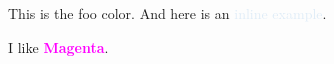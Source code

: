 \documentclass[a4paper]{scrartcl}
\begin{document}
    This is the \textcolor{foo}{foo color}. And here is an
    \textcolor[HTML]{DFECF7}{inline example}.

    I like \textcolor{magenta}{\textbf{Magenta}}.
\end{document}
